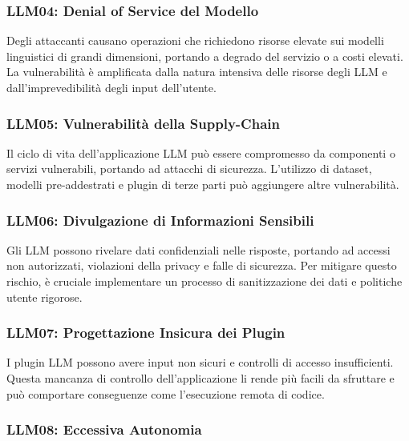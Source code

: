 \documentclass[
]{article}
\begin{document}
\subsubsection{LLM04: Denial of Service del
Modello}\label{llm04-denial-of-service-del-modello}

Degli attaccanti causano operazioni che richiedono risorse elevate sui
modelli linguistici di grandi dimensioni, portando a degrado del
servizio o a costi elevati. La vulnerabilità è amplificata dalla natura
intensiva delle risorse degli LLM e dall'imprevedibilità degli input
dell'utente.

\subsubsection{LLM05: Vulnerabilità della
Supply-Chain}\label{llm05-vulnerabilituxe0-della-supply-chain}

Il ciclo di vita dell'applicazione LLM può essere compromesso da
componenti o servizi vulnerabili, portando ad attacchi di sicurezza.
L'utilizzo di dataset, modelli pre-addestrati e plugin di terze parti
può aggiungere altre vulnerabilità.

\subsubsection{LLM06: Divulgazione di Informazioni
Sensibili}\label{llm06-divulgazione-di-informazioni-sensibili}

Gli LLM possono rivelare dati confidenziali nelle risposte, portando ad
accessi non autorizzati, violazioni della privacy e falle di sicurezza.
Per mitigare questo rischio, è cruciale implementare un processo di
sanitizzazione dei dati e politiche utente rigorose.

\subsubsection{LLM07: Progettazione Insicura dei
Plugin}\label{llm07-progettazione-insicura-dei-plugin}

I plugin LLM possono avere input non sicuri e controlli di accesso
insufficienti. Questa mancanza di controllo dell'applicazione li rende
più facili da sfruttare e può comportare conseguenze come l'esecuzione
remota di codice.

\subsubsection{LLM08: Eccessiva
Autonomia}\label{llm08-eccessiva-autonomia}
\end{document}
